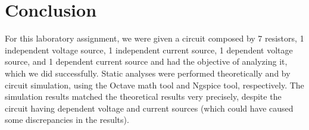 \section{Conclusion}
\label{sec:conclusion}


For this laboratory assignment, we were given a circuit composed by 7 resistors, 1 
independent voltage source, 1 independent current source, 1 dependent voltage source, and 1 
dependent current source and had the objective of analyzing it, which we did successfully.
Static analyses were performed theoretically and by circuit simulation, using the Octave 
math tool and Ngspice tool, respectively. The simulation results matched the theoretical 
results very precisely, despite the circuit having dependent voltage and current sources 
(which could have caused some discrepancies in the results).

